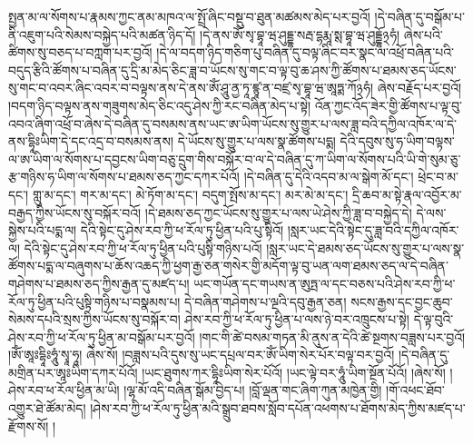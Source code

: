 སྤྱན་མ་ལ་སོགས་པ་རྣམས་ཀྱང་ནམ་མཁའ་ལ་སྤྲོ་ཞིང་བསྡུ་བ་ཐུན་མཚམས་མེད་པར་བྱའོ། །དེ་བཞིན་དུ་བསྒོམ་པ་ནི་འཇུག་པའི་སེམས་བསྐྱེད་པའི་མཚན་ཉིད་དོ། །དེ་ནས་ཨོཾ་སྭ་བྷཱ་ཝ་ཤུདྡྷ་སརྦ་དྷརྨཱ་སྶ་བྷཱ་ཝ་ཤུདྡྷོ྅ཧཾ། ཞེས་པའི་ཚིགས་སུ་བཅད་པ་བཀླག་པར་བྱའོ། །དེ་ལ་བདག་ཉིད་གཅིག་པུ་བཞིན་དུ་བལྟ་ཞིང་བར་སྣང་ལ་འཕྲོ་བཞིན་པའི་བདུད་རྩིའི་ཚོགས་པ་བཞིན་དུ་དྲི་མ་མེད་ཅིང་ཟླ་བ་ཡོངས་སུ་གང་བ་ལྟ་བུ་ཆ་ཤས་ཀྱི་ཚོགས་པ་ཐམས་ཅད་ཡོངས་སུ་གང་བ་འབར་ཞིང་འབར་བ་བལྟས་ནས་དེ་ནས་ཨོཾ་ཤཱུ་ནྱ་ཏཱ་ཛྙཱ་ན་བཛྲ་སྭ་བྷཱ་ཝ་ཨཱཏྨ་ཀོ྅ཧཾ། ཞེས་བརྗོད་པར་བྱའོ། །བདག་ཉིད་བལྟས་ནས་གཟུགས་མེད་ཅིང་འདུ་ཤེས་ཀྱི་རང་བཞིན་མེད་པ་སྟེ། འོན་ཀྱང་འོད་ཟེར་གྱི་ཚོགས་པ་ལྟ་བུ་འབའ་ཞིག་འཕྲོ་བ་ཞེས་དེ་བཞིན་དུ་བསམས་ནས་ཡང་ཨ་ཡིག་ཡོངས་སུ་གྱུར་པ་ལས་ཟླ་བའི་དཀྱིལ་འཁོར་ལ་དེ་ནས་དྷཱིཿཡིག་དེ་དང་འདྲ་བ་བསམས་ནས། དེ་ཡོངས་སུ་གྱུར་པ་ལས་སྣ་ཚོགས་པདྨ། དེའི་དབུས་སུ་ཧ་ཡིག་བལྟས་ལ་ཨ་ཡིག་ལ་སོགས་པ་དབྱངས་ཡིག་བཅུ་དྲུག་གིས་བསྐོར་བ་ལ་དེ་བཞིན་དུ་ཀ་ཡིག་ལ་སོགས་པའི་ཡི་གེ་སུམ་ཅུ་རྩ་གཉིས་ཧ་ཡིག་ལ་སོགས་པ་ཐམས་ཅད་ཀྱང་དཀར་པོའོ། །དེ་བཞིན་དུ་དེའི་འདབ་མ་ལ་སྒེག་མོ་དང་། ཕྲེང་བ་མ་དང་། གླུ་མ་དང་། གར་མ་དང་། མེ་ཏོག་མ་དང་། བདུག་སྤོས་མ་དང་། མར་མེ་མ་དང་། དྲི་ཆབ་མ་སྟེ་རྣལ་འབྱོར་མ་བརྒྱད་ཀྱིས་ཡོངས་སུ་བསྐོར་བའོ། །དེ་ཐམས་ཅད་ཀྱང་ཡོངས་སུ་གྱུར་པ་ལས་ཡེ་ཤེས་ཀྱི་ཟླ་བ་བསྐྱེད་དེ། དེ་ལས་སྐྱེས་པའི་པདྨ་ལ། དེའི་སྟེང་དུ་ཤེས་རབ་ཀྱི་ཕ་རོལ་ཏུ་ཕྱིན་པའི་པུ་སྟིའོ། །སླར་ཡང་དེའི་སྟེང་དུ་ཟླ་བའི་དཀྱིལ་འཁོར་ལ། དེའི་སྟེང་དུ་ཤེས་རབ་ཀྱི་ཕ་རོལ་ཏུ་ཕྱིན་པའི་པུསྟི་གཉིས་པའོ། །སླར་ཡང་དེ་ཐམས་ཅད་ཡོངས་སུ་གྱུར་པ་ལས་སྣ་ཚོགས་པདྨ་ལ་བཞུགས་པ་ཆོས་འཆད་ཀྱི་ཕྱག་རྒྱ་ཅན་གསེར་གྱི་མདོག་ལྟ་བུ་ཡན་ལག་ཐམས་ཅད་ལ་དེ་བཞིན་གཤེགས་པ་ཐམས་ཅད་ཀྱིས་རྒྱན་དུ་མཛད་པ། ཡང་གཡོན་དང་གཡས་ན་ཨུཏྤ་ལ་དང་བཅས་པའི་ཤེས་རབ་ཀྱི་ཕ་རོལ་ཏུ་ཕྱིན་པའི་པུསྟི་གཉིས་པ་བསྣམས་པ། དེ་བཞིན་གཤེགས་པ་ལྔའི་དབུ་རྒྱན་ཅན། སངས་རྒྱས་དང་བྱང་ཆུབ་སེམས་དཔའི་སྲས་ཀྱིས་ཡོངས་སུ་བསྐོར་བ། ཤེས་རབ་ཀྱི་ཕ་རོལ་ཏུ་ཕྱིན་པ་ལས་ཉེ་བར་འཁྲུངས་པ་སྟེ། དེ་ལྟ་བུའི་ཤེས་རབ་ཀྱི་ཕ་རོལ་ཏུ་ཕྱིན་མ་བསྒོམ་པར་བྱའོ། །གང་གི་ཚེ་བསམ་གཏན་མི་ནུས་ན་དེའི་ཚེ་སྔགས་བཟླས་པར་བྱའོ། །ཨོཾ་ཨཱཿདྷཱིཿཧཱུཾ་སྭཱ་ཧཱ། ཞེས་སོ། །བཟླས་པའི་དུས་སུ་ཡང་དཔྲལ་བར་ཨོཾ་ཡིག་སེར་པོར་བལྟ་བར་བྱའོ། །དེ་བཞིན་དུ་མགྲིན་པར་ཨཱཿཡིག་དཀར་པོའོ། །ཡང་ཐུགས་ཀར་དྷཱིཿཡིག་སེར་པོའོ། །ཡང་ལྟེ་བར་ཧཱུཾ་ཡིག་སྔོན་པོའོ། །ཞེས་སོ། །ཤེས་རབ་ཕ་རོལ་ཕྱིན་མ་ཡི། །ལྷ་མོ་འདི་བཞིན་སྒོམ་བྱེད་པ། །བློ་ལྡན་གང་ཞིག་ཀུན་མཁྱེན་གྱི། །གོ་འཕང་ཐོབ་འགྱུར་ཐེ་ཚོམ་མེད། །ཤེས་རབ་ཀྱི་ཕ་རོལ་ཏུ་ཕྱིན་མའི་སྒྲུབ་ཐབས་སློབ་དཔོན་འཕགས་པ་ཐོགས་མེད་ཀྱིས་མཛད་པ་རྫོགས་སོ། །